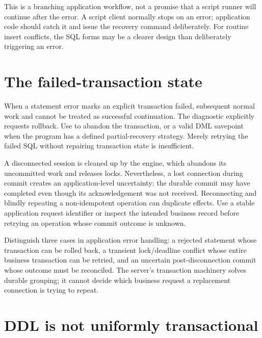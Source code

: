 This is a branching application workflow, not a promise that a script runner
will continue after the error. A script client normally stops on an error;
application code should catch it and issue the recovery command deliberately.
For routine insert conflicts, the SQL  forms may be a
clearer design than deliberately triggering an error.


\section{The failed-transaction state}

When a statement error marks an explicit transaction failed, subsequent
normal work and  cannot be treated as successful continuation.
The diagnostic explicitly requests rollback. Use  to abandon
the transaction, or  a valid DML savepoint when the program
has a defined partial-recovery strategy. Merely retrying the failed SQL
without repairing transaction state is insufficient.

A disconnected session is cleaned up by the engine, which abandons its
uncommitted work and releases locks. Nevertheless, a lost connection during
commit creates an application-level uncertainty: the durable commit may have
completed even though its acknowledgement was not received. Reconnecting and
blindly repeating a non-idempotent operation can duplicate effects. Use a
stable application request identifier or inspect the intended business record
before retrying an operation whose commit outcome is unknown.

Distinguish three cases in application error handling: a rejected statement
whose transaction can be rolled back, a transient lock/deadline conflict
whose entire business transaction can be retried, and an uncertain
post-disconnection commit whose outcome must be reconciled. The server's
transaction machinery solves durable grouping; it cannot decide which
business request a replacement connection is trying to repeat.

\section{DDL is not uniformly transactional}

